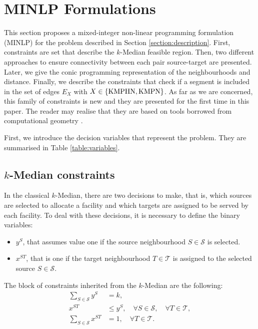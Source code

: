 \documentclass[a4paper,  review, authoryear, 1p.]{elsarticle}
\begin{document}
	\section{MINLP Formulations}\label{section:formulations}
	
	This section proposes a mixed-integer non-linear programming formulation (MINLP) for the problem described in Section \ref{section:description}. First, constraints are set that describe the $k$-Median feasible region. Then, two different approaches to ensure connectivity between each pair source-target are presented. Later, we give the conic programming representation of the neighbourhoods and distance. Finally, we describe the constraints that check if a segment is included in the set of edges $E_X$ with $X\in \{\rm KMPHN, \rm KMPN\}$. As far as we are concerned, this family of constraints is new and they are presented for the first time in this paper. The reader may realise that they are based on tools borrowed from computational geometry \citep{deberg1990,daescu2008}.
		
		
	First, we introduce the decision variables that represent the problem. They are summarised in Table \ref{table:variables}.

	 

	\subsection{$k$-Median constraints}
	In the classical $k$-Median, there are two decisions to make, that is, which sources are selected to allocate a facility and which targets are assigned to be served by each facility. To deal with these decisions, it is necessary to define the binary variables:
	\begin{itemize}
		\item $y^S$, that assumes value one if the source neighbourhood $S\in\mathcal S$ is selected.
		\item $x^{ST}$, that is one if the target neighbourhood $T\in\mathcal T$ is assigned to the selected source $S\in\mathcal S$.
	\end{itemize}
	
	The block of constraints inherited from the $k$-Median are the following:
	\begin{align}
		\sum_{S\in\mathcal S}y^S&=k,\label{eq:k-median1C}\tag{k-median-C1}\\
		x^{ST}&\leq y^S,\quad\forall S\in\mathcal S,\quad\forall T\in\mathcal T,\label{eq:k-median2C}\tag{k-median-C2}\\
		\sum_{S\in\mathcal S} x^{ST}&=1,\quad\forall T\in\mathcal T\label{eq:k-median3C}\tag{k-median-C3}.
	\end{align}
	
\end{document}
